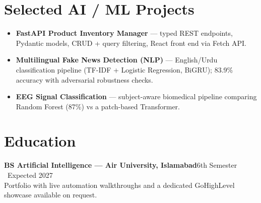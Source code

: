 \documentclass[a4paper,11pt]{article}
\newcommand{\dtitle}[2]{\textbf{#1}\hfill{\color{muted}\small #2}\\}
\begin{document}
\section{Selected AI / ML Projects}
\begin{itemize}
  \item \textbf{FastAPI Product Inventory Manager} — typed REST endpoints, Pydantic models, CRUD + query filtering, React front end via Fetch API.
  \item \textbf{Multilingual Fake News Detection (NLP)} — English/Urdu classification pipeline (TF-IDF + Logistic Regression, BiGRU); 83.9\% accuracy with adversarial robustness checks.
  \item \textbf{EEG Signal Classification} — subject-aware biomedical pipeline comparing Random Forest (87\%) vs a patch-based Transformer.
\end{itemize}

\section{Education}
\dtitle{BS Artificial Intelligence — Air University, Islamabad}{6th Semester \textbullet\ Expected 2027}

\vspace{2pt}
{\small\color{muted} Portfolio with live automation walkthroughs and a dedicated GoHighLevel showcase available on request.}
\end{document}
